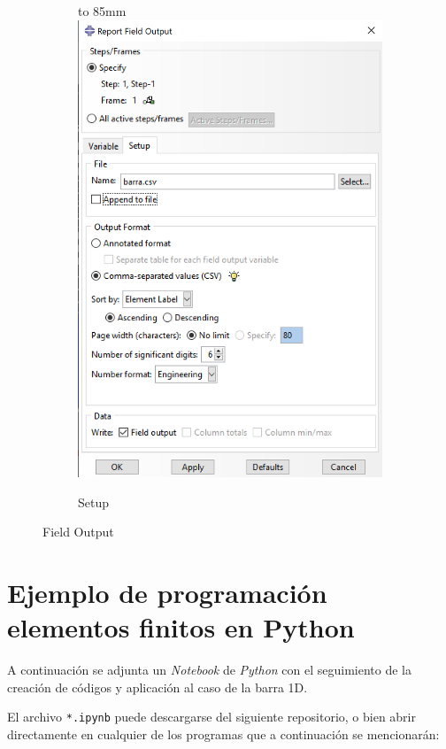 \documentclass[spanish,a4paper,12pt]{article}
\def\imagebox#1#2{\vtop to #1{\null\hbox{#2}\vfill}}
\begin{document}
\begin{figure}
\begin{subfigure}[b]{0.36\textwidth}
    \imagebox{85mm}{\includegraphics[scale=0.35]{capturas/out2.png}}
    \caption{Setup\label{fig:out1b}}
  \end{subfigure}
\caption{Field Output}
\label{fig:out1}
\end{figure}

\clearpage
\section{Ejemplo de programación elementos finitos en Python}
\label{sec:python}

A continuación se adjunta un \emph{Notebook} de \emph{Python} con el seguimiento de la creación de códigos y aplicación al caso de la barra 1D.

El archivo \texttt{*.ipynb} puede descargarse del siguiente repositorio, o bien abrir directamente en cualquier de los programas que a continuación se mencionarán:\\
\end{document}
